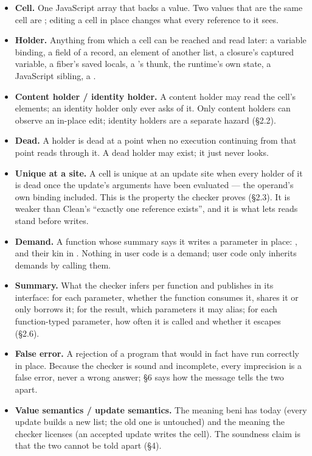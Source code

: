 \begin{itemize}
\item \textbf{Cell.} One JavaScript array that backs a  value. Two  values that are the same cell are \code{===}; editing a cell in place changes what every reference to it sees.
\item \textbf{Holder.} Anything from which a cell can be reached and read later: a variable binding, a field of a record, an element of another list, a closure's captured variable, a fiber's saved locals, a 's thunk, the runtime's own state, a JavaScript sibling, a .
\item \textbf{Content holder / identity holder.} A content holder may read the cell's elements; an identity holder only ever asks  of it. Only content holders can observe an in-place edit; identity holders are a separate hazard (§2.2).
\item \textbf{Dead.} A holder is dead at a point when no execution continuing from that point reads through it. A dead holder may exist; it just never looks.
\item \textbf{Unique at a site.} A cell is unique at an update site when every holder of it is dead once the update's arguments have been evaluated — the operand's own binding included. This is the property the checker proves (§2.3). It is weaker than Clean's “exactly one reference exists”, and it is what lets reads stand before writes.
\item \textbf{Demand.} A function whose summary says it writes a parameter in place: ,  and their kin in . Nothing in user code is a demand; user code only inherits demands by calling them.
\item \textbf{Summary.} What the checker infers per function and publishes in its interface: for each parameter, whether the function consumes it, shares it or only borrows it; for the result, which parameters it may alias; for each function-typed parameter, how often it is called and whether it escapes (§2.6).
\item \textbf{False error.} A rejection of a program that would in fact have run correctly in place. Because the checker is sound and incomplete, every imprecision is a false error, never a wrong answer; §6 says how the message tells the two apart.
\item \textbf{Value semantics / update semantics.} The meaning beni has today (every update builds a new list; the old one is untouched) and the meaning the checker licenses (an accepted update writes the cell). The soundness claim is that the two cannot be told apart (§4).
\end{itemize}
